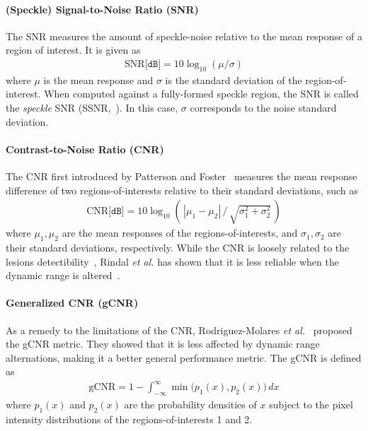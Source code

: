 \paragraph{(Speckle) Signal-to-Noise Ratio (SNR)}
The SNR measures the amount of speckle-noise relative to the mean response of a region of interest.
It is given as
{\small
\begin{align*}
  \mathrm{SNR} \texttt{[dB]} = 10 \log_{10} \left({\mu}/{\sigma}\right)
\end{align*}
}
{\noindent}where \(\mu\) is the mean response and \(\sigma\) is the standard deviation of the region-of-interest.
When computed against a fully-formed speckle region, the SNR is called the \textit{speckle} SNR (SSNR,~\cite{burckhardt_speckle_1978}).
In this case, \(\sigma\) corresponds to the noise standard deviation.

\paragraph{Contrast-to-Noise Ratio (CNR)}
The CNR first introduced by Patterson and Foster~\cite{patterson_improvement_1983} measures the mean response difference of two regions-of-interests relative to their standard deviations, such as
\begin{align*}
  \mathrm{CNR} \texttt{[dB]} = 10 \log_{10} \left(\,| \mu_{1} - \mu_{2} | \,/\, \sqrt{\sigma^2_1 + \sigma^2_2}\, \right)
\end{align*}
{\noindent}where \(\mu_1, \mu_2\) are the mean responses of the regions-of-interests, and \(\sigma_1, \sigma_2\) are their standard deviations, respectively.
While the CNR is loosely related to the lesions detectibility~\cite{smith_ultrasound_1984}, Rindal \textit{et al.} has shown that it is less reliable when the dynamic range is altered~\cite{rindal_effect_2019}.



%

\paragraph{Generalized CNR (gCNR)}
As a remedy to the limitations of the CNR, Rodriguez-Molares \textit{et al.}~\cite{rodriguez-molares_generalized_2020} proposed the gCNR metric.
They showed that it is less affected by dynamic range alternations, making it a better general performance metric.
The gCNR is defined as
{\small
\begin{align*}
  \text{gCNR} = 1 - \int_{-\infty}^{\infty} \min\big(p_1\left(x\right), p_2\left(x\right)\big) \, dx
\end{align*}
}
{\noindent}where \(p_1\left(x\right)\) and \(p_2\left(x\right)\) are the probability densities of \(x\) subject to the pixel intensity distributions of the regions-of-interests 1 and 2.

